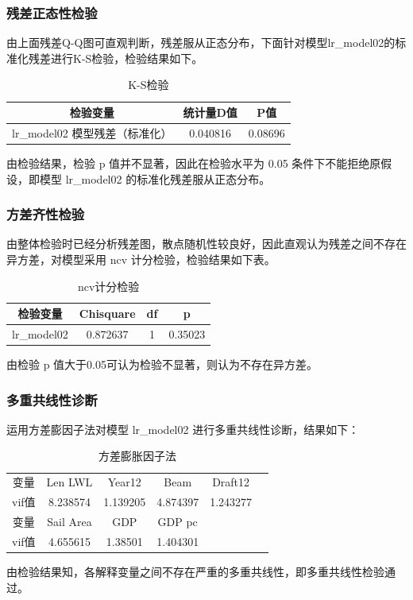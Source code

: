 \documentclass[a4paper,12pt,onecolumn,oneside]{article}
\begin{document}
\subsubsection{残差正态性检验}
由上面残差Q-Q图可直观判断，残差服从正态分布，下面针对模型lr\_model02的标准化残差进行K-S检验，检验结果如下。\par
\begin{table}[h]
	\centering
	\caption{K-S检验}
		\vspace{0.25\baselineskip}
	\begin{tabular}{ccc}
		\toprule
		检验变量 & 统计量D值 & P值 \\
		\hline
		lr\_model02 模型残差（标准化） & 0.040816 & 0.08696 \\
		\bottomrule
	\end{tabular}
\end{table}
由检验结果，检验 p 值并不显著，因此在检验水平为 0.05 条件下不能拒绝原假设，即模型 lr\_model02 的标准化残差服从正态分布。
\subsubsection{方差齐性检验}
由整体检验时已经分析残差图，散点随机性较良好，因此直观认为残差之间不存在异方差，对模型采用 ncv 计分检验，检验结果如下表。\par 
\begin{table}[h]
	\centering
	\caption{ncv计分检验}
		\vspace{0.25\baselineskip}
\begin{tabular}{cccc}
	\toprule
	检验变量 & Chisquare & df & p \\
	\hline
	lr\_model02 & 0.872637 & 1 & 0.35023 \\
	\bottomrule
\end{tabular}
\end{table}

由检验 p 值大于0.05可认为检验不显著，则认为不存在异方差。
\subsubsection{多重共线性诊断}
运用方差膨因子法对模型 lr\_model02 进行多重共线性诊断，结果如下：\par 
\begin{table}[htbp]
	\centering
	\caption{方差膨胀因子法}\vspace{0.25\baselineskip}
	\begin{tabular}{cccccc}
		\toprule
		变量 & Len LWL & Year12 & Beam & Draft12 & \\
		vif值 & 8.238574 & 1.139205 & 4.874397 & 1.243277 & \\
		\midrule
		变量 & Sail Area & GDP & GDP pc & & \\
		vif值 & 4.655615 & 1.38501 & 1.404301 & & \\
		\bottomrule
	\end{tabular}%
	\label{tab:my_label}%
\end{table}
由检验结果知，各解释变量之间不存在严重的多重共线性，即多重共线性检验通过。
\end{document}
